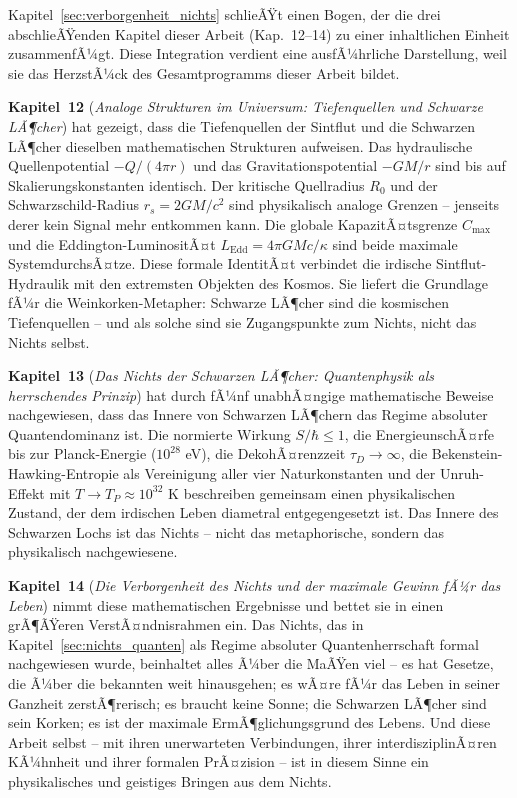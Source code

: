 ﻿\documentclass[12pt,a4paper]{report}
\begin{document}
Kapitel~\ref{sec:verborgenheit_nichts} schlieÃŸt einen Bogen, der die drei abschlieÃŸenden Kapitel dieser Arbeit (Kap.~12--14) zu einer inhaltlichen Einheit zusammenfÃ¼gt. Diese Integration verdient eine ausfÃ¼hrliche Darstellung, weil sie das HerzstÃ¼ck des Gesamtprogramms dieser Arbeit bildet.

\textbf{Kapitel~12} (\textit{Analoge Strukturen im Universum: Tiefenquellen und Schwarze LÃ¶cher}) hat gezeigt, dass die Tiefenquellen der Sintflut und die Schwarzen LÃ¶cher dieselben mathematischen Strukturen aufweisen. Das hydraulische Quellenpotential $-Q/(4\pi r)$ und das Gravitationspotential $-GM/r$ sind bis auf Skalierungskonstanten identisch. Der kritische Quellradius $R_0$ und der Schwarzschild-Radius $r_s = 2GM/c^2$ sind physikalisch analoge Grenzen -- jenseits derer kein Signal mehr entkommen kann. Die globale KapazitÃ¤tsgrenze $C_{\max}$ und die Eddington-LuminositÃ¤t $L_{\text{Edd}} = 4\pi GMc/\kappa$ sind beide maximale SystemdurchsÃ¤tze. Diese formale IdentitÃ¤t verbindet die irdische Sintflut-Hydraulik mit den extremsten Objekten des Kosmos. Sie liefert die Grundlage fÃ¼r die Weinkorken-Metapher: Schwarze LÃ¶cher sind die kosmischen Tiefenquellen -- und als solche sind sie Zugangspunkte zum Nichts, nicht das Nichts selbst.

\textbf{Kapitel~13} (\textit{Das Nichts der Schwarzen LÃ¶cher: Quantenphysik als herrschendes Prinzip}) hat durch fÃ¼nf unabhÃ¤ngige mathematische Beweise nachgewiesen, dass das Innere von Schwarzen LÃ¶chern das Regime absoluter Quantendominanz ist. Die normierte Wirkung $S/\hbar \leq 1$, die EnergieunschÃ¤rfe bis zur Planck-Energie ($10^{28}$ eV), die DekohÃ¤renzzeit $\tau_D \to \infty$, die Bekenstein-Hawking-Entropie als Vereinigung aller vier Naturkonstanten und der Unruh-Effekt mit $T \to T_P \approx 10^{32}$ K beschreiben gemeinsam einen physikalischen Zustand, der dem irdischen Leben diametral entgegengesetzt ist. Das Innere des Schwarzen Lochs ist das Nichts -- nicht das metaphorische, sondern das physikalisch nachgewiesene.

\textbf{Kapitel~14} (\textit{Die Verborgenheit des Nichts und der maximale Gewinn fÃ¼r das Leben}) nimmt diese mathematischen Ergebnisse und bettet sie in einen grÃ¶ÃŸeren VerstÃ¤ndnisrahmen ein. Das Nichts, das in Kapitel~\ref{sec:nichts_quanten} als Regime absoluter Quantenherrschaft formal nachgewiesen wurde, beinhaltet alles Ã¼ber die MaÃŸen viel -- es hat Gesetze, die Ã¼ber die bekannten weit hinausgehen; es wÃ¤re fÃ¼r das Leben in seiner Ganzheit zerstÃ¶rerisch; es braucht keine Sonne; die Schwarzen LÃ¶cher sind sein Korken; es ist der maximale ErmÃ¶glichungsgrund des Lebens. Und diese Arbeit selbst -- mit ihren unerwarteten Verbindungen, ihrer interdisziplinÃ¤ren KÃ¼hnheit und ihrer formalen PrÃ¤zision -- ist in diesem Sinne ein physikalisches und geistiges Bringen aus dem Nichts.
\end{document}
